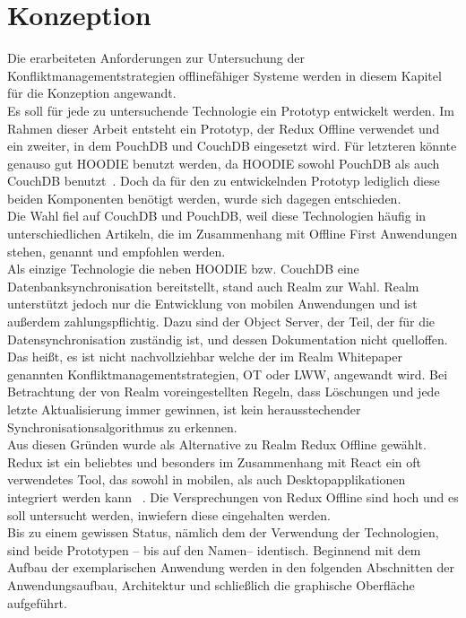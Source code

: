 \chapter{\label{chap:konzeption}Konzeption}
Die erarbeiteten Anforderungen zur Untersuchung der Konfliktmanagementstrategien offlinefähiger Systeme werden in diesem Kapitel für die Konzeption angewandt.\\
Es soll für jede zu untersuchende Technologie ein Prototyp entwickelt werden.
Im Rahmen dieser Arbeit entsteht ein Prototyp, der Redux Offline verwendet und ein zweiter, in dem PouchDB und CouchDB eingesetzt wird.
Für letzteren könnte genauso gut HOODIE benutzt werden, da HOODIE sowohl PouchDB als auch CouchDB benutzt~\cite{hoodie-how}.
Doch da für den zu entwickelnden Prototyp lediglich diese beiden Komponenten benötigt werden, wurde sich dagegen entschieden.\\
%
Die Wahl fiel auf CouchDB und PouchDB, weil diese Technologien häufig in unterschiedlichen Artikeln, die im Zusammenhang mit Offline First Anwendungen stehen, genannt und empfohlen werden.\\
% 
Als einzige Technologie die neben HOODIE bzw. CouchDB eine Datenbanksynchronisation bereitstellt, stand auch Realm zur Wahl.
Realm unterstützt jedoch nur die Entwicklung von mobilen Anwendungen und ist außerdem zahlungspflichtig.
Dazu sind der Object Server, der Teil, der für die Datensynchronisation zuständig ist, und dessen Dokumentation nicht quelloffen.
Das heißt, es ist nicht nachvollziehbar welche der im Realm Whitepaper genannten Konfliktmanagementstrategien, \gls{OT} oder \gls{LWW}, angewandt wird.
Bei Betrachtung der von Realm voreingestellten Regeln, dass Löschungen und jede letzte Aktualisierung immer gewinnen, ist kein herausstechender Synchronisationsalgorithmus zu erkennen.\\
% 
Aus diesen Gründen wurde als Alternative zu Realm Redux Offline gewählt. Redux ist ein beliebtes und besonders im Zusammenhang mit React ein oft verwendetes Tool, das sowohl in mobilen, als auch Desktopapplikationen integriert werden kann ~\cite{statereact}.
Die Versprechungen von Redux Offline sind hoch und es soll untersucht werden, inwiefern diese eingehalten werden.\\
% 
% 
% 
Bis zu einem gewissen Status, nämlich dem der Verwendung der Technologien, sind beide Prototypen -- bis auf den Namen-- identisch.
Beginnend mit dem Aufbau der exemplarischen Anwendung werden in den folgenden Abschnitten der Anwendungsaufbau, Architektur und schließlich die graphische Oberfläche aufgeführt.
%
%
